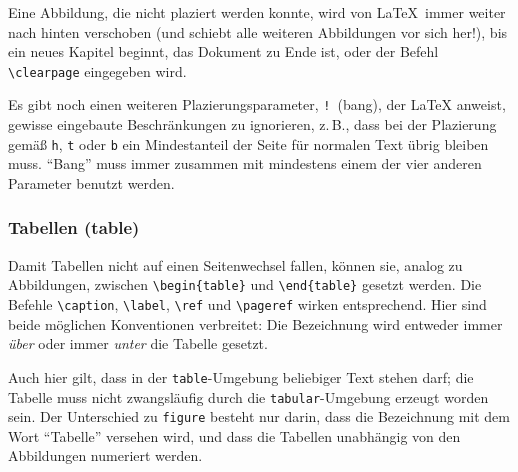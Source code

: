 Eine Abbildung, die nicht plaziert werden konnte, wird von
\LaTeX\ immer weiter nach hinten verschoben (und schiebt alle
weiteren Abbildungen vor sich her!), bis ein neues Kapitel
beginnt, das Dokument zu Ende ist, oder der Befehl
\verb|\clearpage| eingegeben wird.  


Es gibt noch einen weiteren Plazierungsparameter, 
\texttt{!}\ (bang), der \LaTeX{} anweist, 
gewisse eingebaute Beschränkungen zu ignorieren, 
z.\,B., dass bei der Plazierung gemäß \texttt{h}, \texttt{t} oder \texttt{b}
ein Mindestanteil der Seite für normalen Text übrig bleiben muss.
"`Bang"' muss immer zusammen mit mindestens einem der vier
anderen Parameter benutzt werden.  
 


\subsubsection{Tabellen (table)}

\begin{sloppypar}
\relax %

Damit Tabellen nicht auf einen Seitenwechsel fallen,
können sie, analog zu Abbildungen, zwischen
\verb|\begin{table}| und \verb|\end{table}| gesetzt werden.
Die Befehle
\verb|\caption|, \verb|\label|, \verb|\ref| und \verb|\pageref|
wirken entsprechend.
Hier sind beide möglichen Konventionen verbreitet: Die
Bezeichnung wird entweder immer \emph{über} oder immer
\emph{unter} die Tabelle gesetzt.
\end{sloppypar}

Auch hier gilt, dass in der \texttt{table}-Umgebung  beliebiger
Text stehen darf; die Tabelle muss nicht zwangsläufig durch die
\texttt{tabular}-Umgebung erzeugt worden sein.
Der Unterschied zu \texttt{figure} besteht nur darin, 
dass die Bezeichnung mit dem Wort "`Tabelle"' versehen wird,
und dass die Tabellen unabhängig von den Abbildungen numeriert werden.

\endinput
